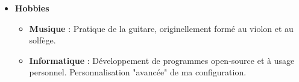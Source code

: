 \documentclass[11pt,a4paper,sans]{moderncv}        %
\begin{document}
\begin{itemize}
\vspace{6pt}

\item \textbf{Hobbies}
\begin{itemize}
\item \textbf{Musique} : Pratique de la guitare, originellement formé au violon et au solfège.
\item \textbf{Informatique} : Développement de programmes open-source et à usage personnel. Personnalisation "avancée" de ma configuration.
\end{itemize}
\end{itemize}


\nocite{*}



\end{document}
